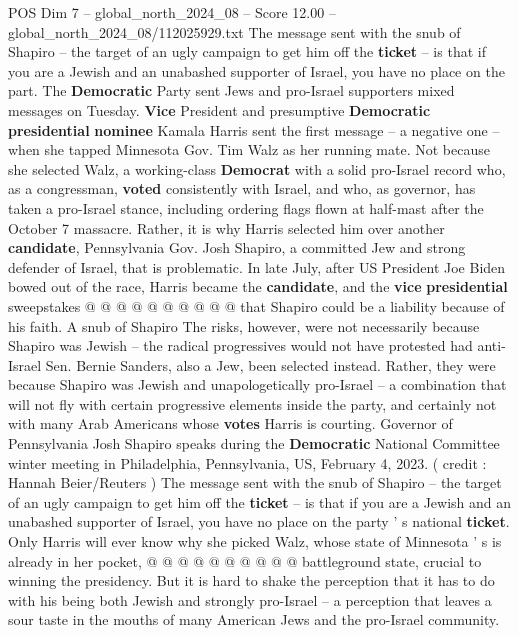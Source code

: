 \begin{textsample}{POS Dim 7 – global\_north\_2024\_08 – Score 12.00 – global\_north\_2024\_08/112025929.txt}  \label{ex:f7_pos_013}
The message sent with the snub of Shapiro -- the target of an ugly campaign to get him off the \textbf{ticket} -- is that if you are a Jewish and an unabashed supporter of Israel, you have no place on the part.
The \textbf{Democratic} Party sent Jews and pro-Israel supporters mixed messages on Tuesday. \textbf{Vice} President and presumptive \textbf{Democratic} \textbf{presidential} \textbf{nominee} Kamala Harris sent the first message -- a negative one -- when she tapped Minnesota Gov.
Tim Walz as her running mate.
Not because she selected Walz, a working-class \textbf{Democrat} with a solid pro-Israel record who, as a congressman, \textbf{voted} consistently with Israel, and who, as governor, has taken a pro-Israel stance, including ordering flags flown at half-mast after the October 7 massacre.
Rather, it is why Harris selected him over another \textbf{candidate}, Pennsylvania Gov.
Josh Shapiro, a committed Jew and strong defender of Israel, that is problematic.
In late July, after US President Joe Biden bowed out of the race, Harris became the \textbf{candidate}, and the \textbf{vice} \textbf{presidential} sweepstakes @ @ @ @ @ @ @ @ @ @ that Shapiro could be a liability because of his faith.
A snub of Shapiro The risks, however, were not necessarily because Shapiro was Jewish -- the radical progressives would not have protested had anti-Israel Sen.
Bernie Sanders, also a Jew, been selected instead.
Rather, they were because Shapiro was Jewish and unapologetically pro-Israel -- a combination that will not fly with certain progressive elements inside the party, and certainly not with many Arab Americans whose \textbf{votes} Harris is courting.
Governor of Pennsylvania Josh Shapiro speaks during the \textbf{Democratic} National Committee winter meeting in Philadelphia, Pennsylvania, US, February 4, 2023. ( credit : Hannah Beier/Reuters ) The message sent with the snub of Shapiro -- the target of an ugly campaign to get him off the \textbf{ticket} -- is that if you are a Jewish and an unabashed supporter of Israel, you have no place on the party ' s national \textbf{ticket}.
Only Harris will ever know why she picked Walz, whose state of Minnesota ' s is already in her pocket, @ @ @ @ @ @ @ @ @ @ battleground state, crucial to winning the presidency.
But it is hard to shake the perception that it has to do with his being both Jewish and strongly pro-Israel -- a perception that leaves a sour taste in the mouths of many American Jews and the pro-Israel community.

\end{textsample}
